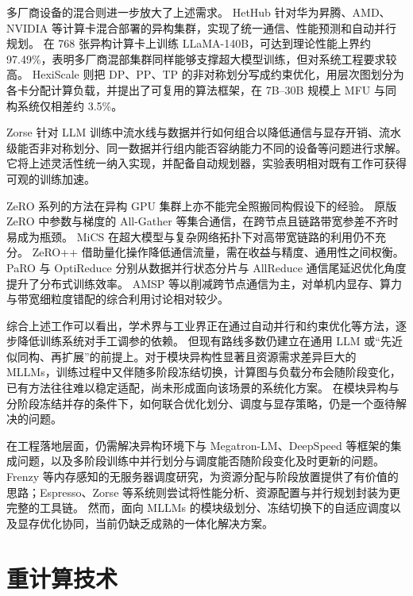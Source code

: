多厂商设备的混合则进一步放大了上述需求。
HetHub\cite{hethub2024} 针对华为昇腾、AMD、NVIDIA 等计算卡混合部署的异构集群，实现了统一通信、性能预测和自动并行规划。
在 768 张异构计算卡上训练 LLaMA-140B，可达到理论性能上界约 97.49\%，表明多厂商混部集群同样能够支撑超大模型训练，但对系统工程要求较高。
HexiScale\cite{hexiscale2024} 则把 DP、PP、TP 的非对称划分写成约束优化，用层次图划分为各卡分配计算负载，并提出了可复用的算法框架，在 7B--30B 规模上 MFU 与同构系统仅相差约 3.5\%。

Zorse\cite{zorse2025} 针对 LLM 训练中流水线与数据并行如何组合以降低通信与显存开销、流水级能否非对称划分、同一数据并行组内能否容纳能力不同的设备等问题进行求解。
它将上述灵活性统一纳入实现，并配备自动规划器，实验表明相对既有工作可获得可观的训练加速。

ZeRO 系列的方法在异构 GPU 集群上亦不能完全照搬同构假设下的经验。
原版 ZeRO\cite{zero2020,zero2021} 中参数与梯度的 All-Gather 等集合通信，在跨节点且链路带宽参差不齐时易成为瓶颈。
MiCS\cite{mics2022} 在超大模型与复杂网络拓扑下对高带宽链路的利用仍不充分。
ZeRO++\cite{zeroplusplus} 借助量化操作降低通信流量，需在收益与精度、通用性之间权衡。
PaRO\cite{paro2024} 与 OptiReduce\cite{optireduce2025} 分别从数据并行状态分片与 AllReduce 通信尾延迟优化角度提升了分布式训练效率。
AMSP\cite{amsp} 等以削减跨节点通信为主，对单机内显存、算力与带宽细粒度错配的综合利用讨论相对较少。

综合上述工作可以看出，学术界与工业界正在通过自动并行和约束优化等方法，逐步降低训练系统对手工调参的依赖。
但现有路线多数仍建立在通用 LLM 或“先近似同构、再扩展”的前提上。对于模块异构性显著且资源需求差异巨大的 MLLMs，训练过程中又伴随多阶段冻结切换，计算图与负载分布会随阶段变化，已有方法往往难以稳定适配，尚未形成面向该场景的系统化方案。
在模块异构与分阶段冻结并存的条件下，如何联合优化划分、调度与显存策略，仍是一个亟待解决的问题。

在工程落地层面，仍需解决异构环境下与 Megatron-LM、DeepSpeed 等框架的集成问题，以及多阶段训练中并行划分与调度能否随阶段变化及时更新的问题。
Frenzy\cite{frenzy_memory2024} 等内存感知的无服务器调度研究，为资源分配与阶段放置提供了有价值的思路；Espresso、Zorse 等系统则尝试将性能分析、资源配置与并行规划封装为更完整的工具链。
然而，面向 MLLMs 的模块级划分、冻结切换下的自适应调度以及显存优化协同，当前仍缺乏成熟的一体化解决方案。

\section{重计算技术}
\label{sec:chap2-recomputation}

